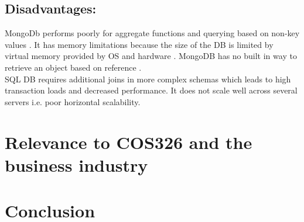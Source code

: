 \documentclass[hidelinks,english]{article}
\begin{document}
\subsection{Disadvantages:}
MongoDb performs poorly for aggregate functions and querying based on non-key values \cite{parker2013comparing}. It has memory limitations because the size of the DB is limited by virtual memory provided by OS and hardware \cite{MakbleAdvanDisadvan}. MongoDB has no built in way to retrieve an object based on reference \cite{parker2013comparing}.\\[0.5cm]
SQL DB requires additional joins in more complex schemas \cite{parker2013comparing, upguardmysqlmongodb} which leads to high transaction loads and decreased performance. It does not scale well across several servers \cite{upguardmysqlmongodb} i.e. poor horizontal scalability.

   
   \section{Relevance to COS326 and the business industry}
    
    \section{Conclusion}
	
	
	
\end{document}
